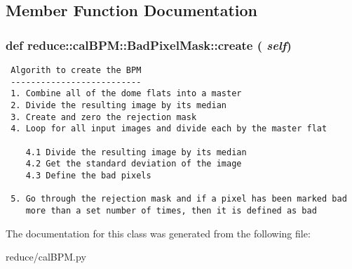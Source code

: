 \subsection{Member Function Documentation}
\subsubsection{\setlength{\rightskip}{0pt plus 5cm}def reduce::cal\-BPM::Bad\-Pixel\-Mask::create ( {\em self})}\label{classreduce_1_1calBPM_1_1BadPixelMask_f34d31f02e27e7957a0cec70c9bb7c08}




\footnotesize\begin{verbatim}
 Algorith to create the BPM
 -------------------------- 
 1. Combine all of the dome flats into a master
 2. Divide the resulting image by its median
 3. Create and zero the rejection mask
 4. Loop for all input images and divide each by the master flat
    
    4.1 Divide the resulting image by its median
    4.2 Get the standard deviation of the image
    4.3 Define the bad pixels
    
 5. Go through the rejection mask and if a pixel has been marked bad 
    more than a set number of times, then it is defined as bad
\end{verbatim}
\normalsize
 

The documentation for this class was generated from the following file:\begin{CompactItemize}
\item 
reduce/cal\-BPM.py\end{CompactItemize}
